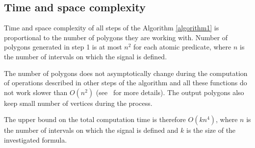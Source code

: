 \subsection{Time and space complexity}
\enlargethispage{8mm}
Time and space complexity of all steps of the Algorithm \ref{algorithm1} is proportional to the number of polygons they are working with. Number of polygons generated in step 1 is at most $n^2$ for each atomic predicate, where $n$ is the number of intervals on which the signal is defined.

The number of polygons does not asymptotically change during the computation of operations described in other steps of the algorithm and all these functions do not work slower than $O(n^2)$ (see~\cite{GeometricAlgorithms} for more details). The output polygons also keep small number of vertices during the process.

The upper bound on the total computation time is therefore $O(kn^4)$, where $n$ is the number of intervals on which the signal is defined and $k$ is the size of the investigated formula.  

